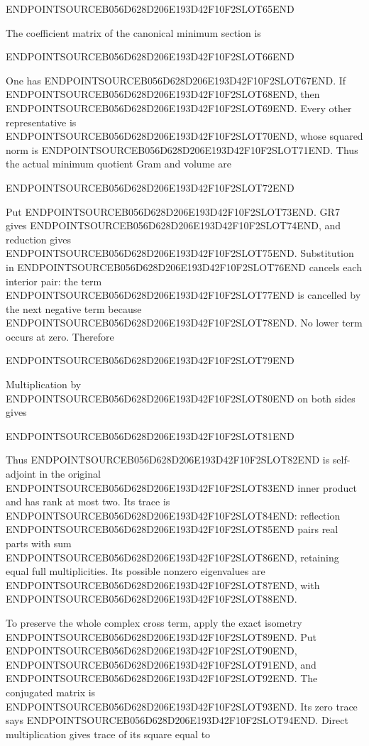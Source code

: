 ENDPOINTSOURCEB056D628D206E193D42F10F2SLOT65END

The coefficient matrix of the canonical minimum section is

ENDPOINTSOURCEB056D628D206E193D42F10F2SLOT66END

One has ENDPOINTSOURCEB056D628D206E193D42F10F2SLOT67END. If ENDPOINTSOURCEB056D628D206E193D42F10F2SLOT68END, then ENDPOINTSOURCEB056D628D206E193D42F10F2SLOT69END. Every other representative is ENDPOINTSOURCEB056D628D206E193D42F10F2SLOT70END, whose squared norm is ENDPOINTSOURCEB056D628D206E193D42F10F2SLOT71END. Thus the actual minimum quotient Gram and volume are

ENDPOINTSOURCEB056D628D206E193D42F10F2SLOT72END

Put ENDPOINTSOURCEB056D628D206E193D42F10F2SLOT73END. GR7 gives ENDPOINTSOURCEB056D628D206E193D42F10F2SLOT74END, and reduction gives ENDPOINTSOURCEB056D628D206E193D42F10F2SLOT75END. Substitution in ENDPOINTSOURCEB056D628D206E193D42F10F2SLOT76END cancels each interior pair: the term ENDPOINTSOURCEB056D628D206E193D42F10F2SLOT77END is cancelled by the next negative term because ENDPOINTSOURCEB056D628D206E193D42F10F2SLOT78END. No lower term occurs at zero. Therefore

ENDPOINTSOURCEB056D628D206E193D42F10F2SLOT79END

Multiplication by ENDPOINTSOURCEB056D628D206E193D42F10F2SLOT80END on both sides gives

ENDPOINTSOURCEB056D628D206E193D42F10F2SLOT81END

Thus ENDPOINTSOURCEB056D628D206E193D42F10F2SLOT82END is self-adjoint in the original ENDPOINTSOURCEB056D628D206E193D42F10F2SLOT83END inner product and has rank at most two. Its trace is ENDPOINTSOURCEB056D628D206E193D42F10F2SLOT84END: reflection ENDPOINTSOURCEB056D628D206E193D42F10F2SLOT85END pairs real parts with sum ENDPOINTSOURCEB056D628D206E193D42F10F2SLOT86END, retaining equal full multiplicities. Its possible nonzero eigenvalues are ENDPOINTSOURCEB056D628D206E193D42F10F2SLOT87END, with ENDPOINTSOURCEB056D628D206E193D42F10F2SLOT88END.

To preserve the whole complex cross term, apply the exact isometry ENDPOINTSOURCEB056D628D206E193D42F10F2SLOT89END. Put ENDPOINTSOURCEB056D628D206E193D42F10F2SLOT90END, ENDPOINTSOURCEB056D628D206E193D42F10F2SLOT91END, and ENDPOINTSOURCEB056D628D206E193D42F10F2SLOT92END. The conjugated matrix is ENDPOINTSOURCEB056D628D206E193D42F10F2SLOT93END. Its zero trace says ENDPOINTSOURCEB056D628D206E193D42F10F2SLOT94END. Direct multiplication gives trace of its square equal to

